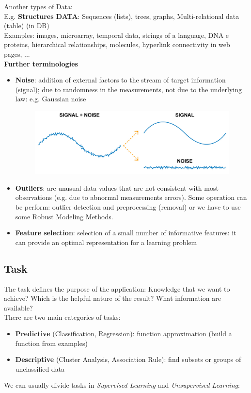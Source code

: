 \documentclass[../main.tex]{subfiles}
\begin{document}
\noindent Another types of Data:\\
\noindent E.g. \textbf{Structures DATA}: Sequences (lists), trees, graphs, Multi-relational data (table) (in DB)\\
Examples: images, microarray, temporal data, strings of a language, DNA e proteins, hierarchical relationships, molecules, hyperlink connectivity in web pages, ...\\

\noindent\textbf{Further terminologies}\\
\begin{itemize}
    \item \textbf{Noise}: addition of external factors to the stream of target information (signal); due to randomness in the measurements, not due to the underlying law: e.g. Gaussian noise
    
    \begin{figure}[H]
    \centering
    \includegraphics[scale=0.2]{lectures/1_Introduction/sig_noise.jpg}
    \end{figure}
  

    \item \textbf{Outliers}: are unusual data values that are not consistent with most observations (e.g. due to abnormal measurements errors). Some operation can be perform: outlier detection and preprocessing (removal) or we have to use some Robust Modeling Methods.
    \item \textbf{Feature selection}: selection of a small number of informative features: it can provide an optimal representation for a learning problem
\end{itemize}

\subsection{Task}
The task defines the purpose of the application: Knowledge that we want to achieve? Which is the helpful nature of the result? What information are available?\\
There are two main categories of tasks:
\begin{itemize}
    \item \textbf{Predictive} (Classification, Regression): function approximation (build a function from examples)
    \item \textbf{Descriptive} (Cluster Analysis, Association Rule): find subsets or groups of unclassified data
\end{itemize}
We can usually divide tasks in \textit{Supervised Learning} and \textit{Unsupervised Learning}:\\
\end{document}
